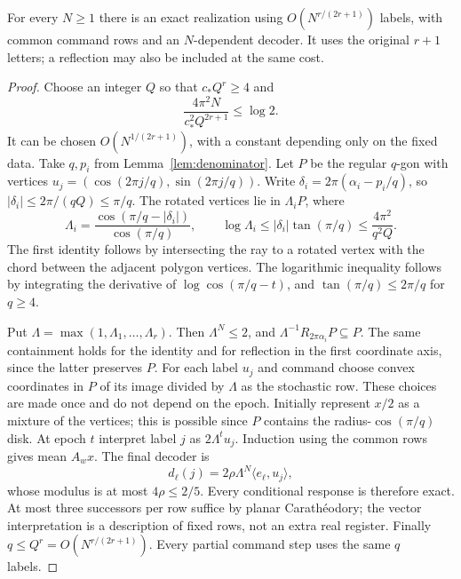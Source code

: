 \begin{proposition}\label{prop:toral-upper}
For every $N\ge1$ there is an exact realization using $O(N^{r/(2r+1)})$ labels, with common command rows and an $N$-dependent decoder. It uses the original $r+1$ letters; a reflection may also be included at the same cost.
\end{proposition}
\begin{proof}
Choose an integer $Q$ so that $c_*Q^r\ge4$ and
\[
 \frac{4\pi^2N}{c_*^2Q^{2r+1}}\le\log2.
\]
It can be chosen $O(N^{1/(2r+1)})$, with a constant depending only on the fixed data. Take $q,p_i$ from Lemma~\ref{lem:denominator}. Let $P$ be the regular $q$-gon with vertices $u_j=(\cos(2\pi j/q),\sin(2\pi j/q))$. Write
$\delta_i=2\pi(\alpha_i-p_i/q)$, so $|\delta_i|\le2\pi/(qQ)\le\pi/q$. The rotated vertices lie in $\Lambda_i P$, where
\begin{equation}\label{eq:polygon-dilation}
 \Lambda_i=\frac{\cos(\pi/q-|\delta_i|)}{\cos(\pi/q)},\qquad
 \log\Lambda_i\le |\delta_i|\tan(\pi/q)
                 \le\frac{4\pi^2}{q^2Q}.
\end{equation}
The first identity follows by intersecting the ray to a rotated vertex with the chord between the adjacent polygon vertices. The logarithmic inequality follows by integrating the derivative of $\log\cos(\pi/q-t)$, and $\tan(\pi/q)\le2\pi/q$ for $q\ge4$.

Put $\Lambda=\max(1,\Lambda_1,\ldots,\Lambda_r)$. Then $\Lambda^N\le2$, and $\Lambda^{-1}R_{2\pi\alpha_i}P\subseteq P$. The same containment holds for the identity and for reflection in the first coordinate axis, since the latter preserves $P$.
For each label $u_j$ and command choose convex coordinates in $P$ of its image divided by $\Lambda$ as the stochastic row. These choices are made once and do not depend on the epoch. Initially represent $x/2$ as a mixture of the vertices; this is possible since $P$ contains the radius-$\cos(\pi/q)$ disk. At epoch $t$ interpret label $j$ as $2\Lambda^tu_j$. Induction using the common rows gives mean $A_wx$. The final decoder is
\[
 d_\ell(j)=2\rho\Lambda^N\langle e_\ell,u_j\rangle,
\]
whose modulus is at most $4\rho\le2/5$. Every conditional response is therefore exact. At most three successors per row suffice by planar Carath\'eodory; the vector interpretation is a description of fixed rows, not an extra real register. Finally $q\le Q^r=O(N^{r/(2r+1)})$. Every partial command step uses the same $q$ labels.
\end{proof}

